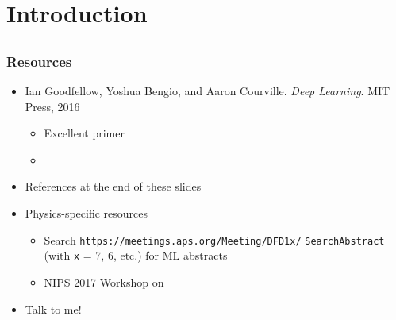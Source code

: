 \section{Introduction}

\subsection{}

\begin{frame}
    \frametitle{Resources}

    \begin{itemize}
        \item Ian Goodfellow, Yoshua Bengio, and Aaron Courville.
        \emph{Deep Learning}.
        MIT Press, 2016
        \nocite{GoodfellowDL}
        \begin{itemize}
            \item Excellent primer
            \item {}
        \end{itemize}
        \item References at the end of these slides
        \item Physics-specific resources
        \begin{itemize}
            \item Search \texttt{https://meetings.aps.org/Meeting/DFD1x/} \texttt{SearchAbstract} (with \texttt{x} = 7, 6, etc.) for ML abstracts
            \item NIPS 2017 Workshop on 
        \end{itemize}
        \item Talk to me! \smiley
    \end{itemize}
\end{frame}

